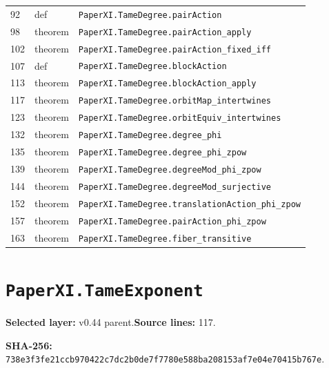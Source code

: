 \documentclass[10pt,oneside]{book}
\begin{document}
\begin{longtable}{@{}p{}p{}p{}@{}}
92&def&\nolinkurl{PaperXI.TameDegree.pairAction}\\

98&theorem&\nolinkurl{PaperXI.TameDegree.pairAction_apply}\\

102&theorem&\nolinkurl{PaperXI.TameDegree.pairAction_fixed_iff}\\

107&def&\nolinkurl{PaperXI.TameDegree.blockAction}\\

113&theorem&\nolinkurl{PaperXI.TameDegree.blockAction_apply}\\

117&theorem&\nolinkurl{PaperXI.TameDegree.orbitMap_intertwines}\\

123&theorem&\nolinkurl{PaperXI.TameDegree.orbitEquiv_intertwines}\\

132&theorem&\nolinkurl{PaperXI.TameDegree.degree_phi}\\

135&theorem&\nolinkurl{PaperXI.TameDegree.degree_phi_zpow}\\

139&theorem&\nolinkurl{PaperXI.TameDegree.degreeMod_phi_zpow}\\

144&theorem&\nolinkurl{PaperXI.TameDegree.degreeMod_surjective}\\

152&theorem&\nolinkurl{PaperXI.TameDegree.translationAction_phi_zpow}\\

157&theorem&\nolinkurl{PaperXI.TameDegree.pairAction_phi_zpow}\\

163&theorem&\nolinkurl{PaperXI.TameDegree.fiber_transitive}\\

\bottomrule\end{longtable}

\section{\texorpdfstring{\nolinkurl{PaperXI.TameExponent}}{PaperXI.TameExponent}}\label{module:PaperXI.TameExponent}

\textbf{Selected layer:} v0.44 parent.\quad\textbf{Source lines:} 117.\par\textbf{SHA-256:} {\scriptsize\nolinkurl{738e3f3fe21ccb970422c7dc2b0de7f7780e588ba208153af7e04e70415b767e}}.
\end{document}
